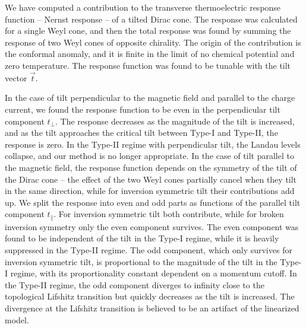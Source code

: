 We have computed a contribution to the transverse thermoelectric response function -- Nernst response -- of a tilted Dirac cone.
The response was calculated for a single Weyl cone, and then the total response was found by summing the response of two Weyl cones of opposite chirality.
The origin of the contribution is the conformal anomaly, and it is finite in the limit of no chemical potential and zero temperature.
The response function was found to be tunable with the tilt vector \( \vec{t} \).

In the case of tilt perpendicular to the magnetic field and parallel to the charge current, we found the response function to be even in the perpendicular tilt component \( t_{\perp} \).
The response decreases as the magnitude of the tilt is increased, and as the tilt approaches the critical tilt between Type-I and Type-II, the response is zero.
In the Type-II regime with perpendicular tilt, the Landau levels collapse, and our method is no longer appropriate.
In the case of tilt parallel to the magnetic field, the response function depends on the symmetry of the tilt of the Dirac cone -- the effect of the two Weyl cones partially cancel when they tilt in the same direction, while for inversion symmetric tilt their contributions add up.
We split the response into even and odd parts as functions of the parallel tilt component \( t_{\parallel} \).
For inversion symmetric tilt both contribute, while for broken inversion symmetry only the even component survives.
The even component was found to be independent of the tilt in the Type-I regime, while it is heavily suppressed in the Type-II regime.
The odd component, which only survives for inversion symmetric tilt, is proportional to the magnitude of the tilt in the Type-I regime, with its proportionality constant dependent on a momentum cutoff.
In the Type-II regime, the odd component diverges to infinity close to the topological Lifshitz transition but quickly decreases as the tilt is increased.
The divergence at the Lifshitz transition is believed to be an artifact of the linearized model.

